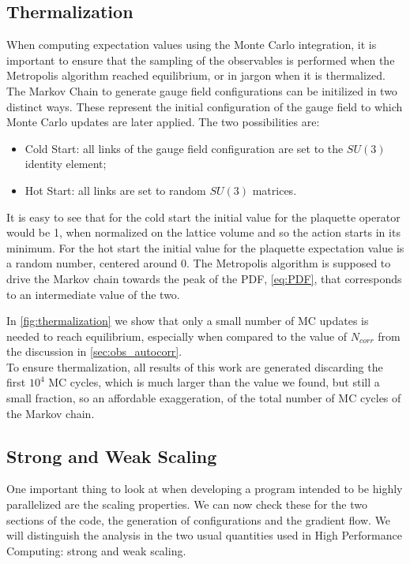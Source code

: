 \subsection{Thermalization}
\label{sec:thermalization}
When computing expectation values using the Monte Carlo integration, it is important to ensure that the sampling of the observables is performed when the Metropolis algorithm reached equilibrium, or in jargon when it is thermalized.\\
The Markov Chain to generate gauge field configurations can be initilized in two distinct ways. These represent the initial configuration of the gauge field to which Monte Carlo updates are later applied. The two possibilities are:
\begin{itemize} 
    \item Cold Start: all links of the gauge field configuration are set to the $SU(3)$ identity element;
    \item Hot Start: all links are set to random $SU(3)$ matrices.
\end{itemize}
It is easy to see that for the cold start the initial value for the plaquette operator would be 1, when normalized on the lattice volume and so the action starts in its minimum. For the hot start the initial value for the plaquette expectation value is a random number, centered around 0. The Metropolis algorithm is supposed to drive the Markov chain towards the peak of the PDF, \cref{eq:PDF}, that corresponds to an intermediate value of the two. \\

In \cref{fig:thermalization} we show that only a small number of MC updates is needed to reach equilibrium, especially when compared to the value of $N_{corr}$ from the discussion in \cref{sec:obs_autocorr}. \\
To ensure thermalization, all results of this work are generated discarding the first $10^4$ MC cycles, which is much larger than the value we found, but still a small fraction, so an affordable exaggeration, of the total number of MC cycles of the Markov chain.

\subsection{Strong and Weak Scaling}
One important thing to look at when developing a program intended to be highly parallelized are the scaling properties. We can now check these for the two sections of the code, the generation of configurations and the gradient flow. We will distinguish the analysis in the two usual quantities used in High Performance Computing: strong and weak scaling. \\
